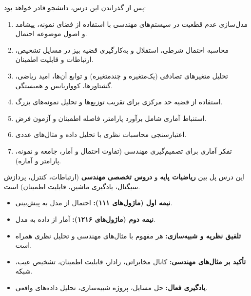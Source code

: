
پس از گذراندن این درس، دانشجو قادر خواهد بود:

\begin{enumerate}
\def\labelenumi{\arabic{enumi}.}
\tightlist
\item
  مدل‌سازی عدم قطعیت در سیستم‌های مهندسی با استفاده از فضای نمونه، پیشامد و اصول موضوعه احتمال.
\item
  محاسبه احتمال شرطی، استقلال و به‌کارگیری قضیه بیز در مسایل تشخیص، ارتباطات و قابلیت اطمینان.
\item
  تحلیل متغیرهای تصادفی (یک‌متغیره و چندمتغیره) و توابع آن‌ها، امید ریاضی، گشتاورها، کوواریانس و همبستگی.
\item
  استفاده از قضیه حد مرکزی برای تقریب توزیع‌ها و تحلیل نمونه‌های بزرگ.
\item
  استنباط آماری شامل برآورد پارامتر، فاصله اطمینان و آزمون فرض.
\item
  اعتبارسنجی محاسبات نظری با تحلیل داده و مثال‌های عددی.
\item
  تفکر آماری برای تصمیم‌گیری مهندسی  (تفاوت احتمال و آمار، جامعه و نمونه، پارامتر و آماره).
\end{enumerate}


این درس پل بین \textbf{ریاضیات پایه} و \textbf{دروس تخصصی مهندسی} (ارتباطات، کنترل، پردازش سیگنال، یادگیری ماشین، قابلیت اطمینان) است.

\begin{itemize}
\tightlist
\item
  \textbf{نیمه اول (ماژول‌های ۱۱۱):} احتمال  از مدل به پیش‌بینی.
\item
  \textbf{نیمه دوم (ماژول‌های ۱۲۱۶):} آمار  از داده به مدل.
\end{itemize}


\begin{itemize}
\tightlist
\item
  \textbf{تلفیق نظریه و شبیه‌سازی:} هر مفهوم با مثال‌های مهندسی و تحلیل نظری همراه است.
\item
  \textbf{تأکید بر مثال‌های مهندسی:} کانال مخابراتی، رادار، قابلیت اطمینان، تشخیص عیب، شبکه.
\item
  \textbf{یادگیری فعال:} حل مسایل، پروژه شبیه‌سازی، تحلیل داده‌های واقعی.
\end{itemize}


